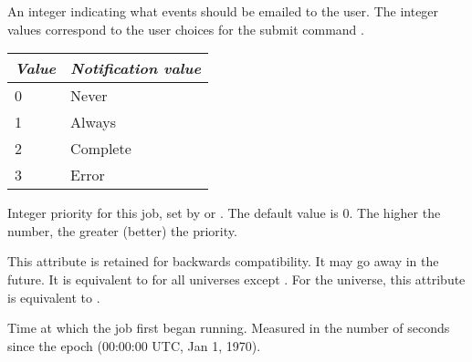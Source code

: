 \begin{description}
\item[\AdAttr{JobNotification}:] An integer indicating what events should
be emailed to the user. The integer values correspond to the user 
choices for the submit command .
\begin{center}
\begin{table}[hbt]
\begin{tabular}{|p{2cm}p{10cm}|} \hline
\emph{Value} & \emph{Notification value} \\ \hline \hline
0 & Never \\ \hline
1 & Always \\ \hline
2 & Complete \\ \hline
3 & Error \\ \hline
\end{tabular}
\end{table}
\end{center}

\item[\AdAttr{JobPrio}:]  Integer priority for this job, set by
 or .  The default value is 0.  The higher
the number, the greater (better) the priority.

\item[\AdAttr{JobRunCount}:]  This attribute is retained for backwards
  compatibility.  It may go away in the future.  It is equivalent to
   for all universes except .
  For the  universe, this attribute is equivalent to
  .

\item[\AdAttr{JobStartDate}:]  Time at which the job first began
running.  Measured in the
number of seconds since the epoch (00:00:00 UTC, Jan 1, 1970).


\end{description}
